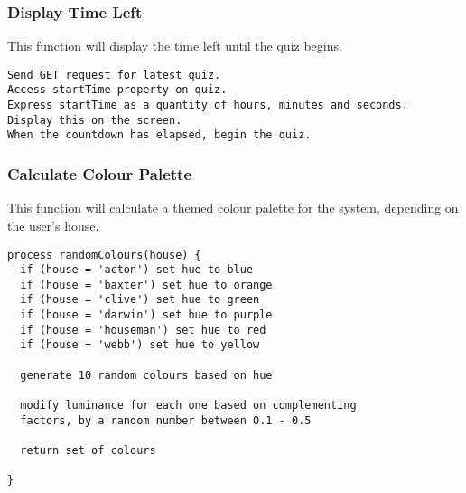 \subsubsection{Display Time Left}
This function will display the time left until the quiz begins.
\begin{verbatim}
Send GET request for latest quiz.
Access startTime property on quiz.
Express startTime as a quantity of hours, minutes and seconds.
Display this on the screen.
When the countdown has elapsed, begin the quiz.
\end{verbatim}

\subsubsection{Calculate Colour Palette}
This function will calculate a themed colour palette for the system, depending on the user's house.
\begin{verbatim}
process randomColours(house) {
  if (house = 'acton') set hue to blue
  if (house = 'baxter') set hue to orange
  if (house = 'clive') set hue to green
  if (house = 'darwin') set hue to purple
  if (house = 'houseman') set hue to red
  if (house = 'webb') set hue to yellow

  generate 10 random colours based on hue

  modify luminance for each one based on complementing
  factors, by a random number between 0.1 - 0.5

  return set of colours

}
\end{verbatim}
